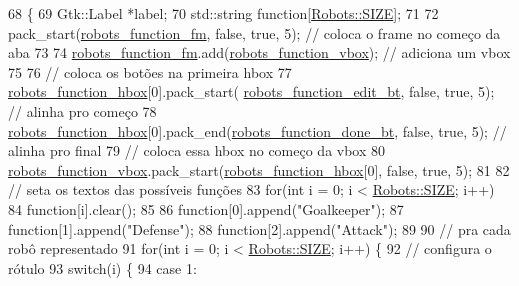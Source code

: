 \begin{DoxyCode}
68                                       \{
69     Gtk::Label *label;
70     std::string \textcolor{keyword}{function}[\hyperlink{class_robots_ae9df2f1d345ad6740f0459956cdd4712}{Robots::SIZE}];
71 
72     pack\_start(\hyperlink{class_robot_g_u_i_af29bd5e935aaf337c5e2afaa4dd2119a}{robots\_function\_fm}, \textcolor{keyword}{false}, \textcolor{keyword}{true}, 5); \textcolor{comment}{// coloca o frame no começo da aba}
73 
74     \hyperlink{class_robot_g_u_i_af29bd5e935aaf337c5e2afaa4dd2119a}{robots\_function\_fm}.add(\hyperlink{class_robot_g_u_i_a6d09ae30b925d6efd7c16e20b21c1781}{robots\_function\_vbox}); \textcolor{comment}{// adiciona um vbox}
75 
76     \textcolor{comment}{// coloca os botões na primeira hbox}
77     \hyperlink{class_robot_g_u_i_aba8f9fd9d3cfea4e5b4fe262ac6e3c0b}{robots\_function\_hbox}[0].pack\_start(
      \hyperlink{class_robot_g_u_i_ac474c7d61bd07aaf26f75acb691e2971}{robots\_function\_edit\_bt}, \textcolor{keyword}{false}, \textcolor{keyword}{true}, 5); \textcolor{comment}{// alinha pro começo}
78     \hyperlink{class_robot_g_u_i_aba8f9fd9d3cfea4e5b4fe262ac6e3c0b}{robots\_function\_hbox}[0].pack\_end(\hyperlink{class_robot_g_u_i_a17db9c0ad94bd601734b87c6aff3fcf0}{robots\_function\_done\_bt}, \textcolor{keyword}{
      false}, \textcolor{keyword}{true}, 5); \textcolor{comment}{// alinha pro final}
79     \textcolor{comment}{// coloca essa hbox no começo da vbox}
80     \hyperlink{class_robot_g_u_i_a6d09ae30b925d6efd7c16e20b21c1781}{robots\_function\_vbox}.pack\_start(\hyperlink{class_robot_g_u_i_aba8f9fd9d3cfea4e5b4fe262ac6e3c0b}{robots\_function\_hbox}[0], \textcolor{keyword}{false},
       \textcolor{keyword}{true}, 5);
81 
82     \textcolor{comment}{// seta os textos das possíveis funções}
83     \textcolor{keywordflow}{for}(\textcolor{keywordtype}{int} i = 0; i < \hyperlink{class_robots_ae9df2f1d345ad6740f0459956cdd4712}{Robots::SIZE}; i++)
84         \textcolor{keyword}{function}[i].clear();
85 
86     \textcolor{keyword}{function}[0].append(\textcolor{stringliteral}{"Goalkeeper"});
87     \textcolor{keyword}{function}[1].append(\textcolor{stringliteral}{"Defense"});
88     \textcolor{keyword}{function}[2].append(\textcolor{stringliteral}{"Attack"});
89 
90     \textcolor{comment}{// pra cada robô representado}
91     \textcolor{keywordflow}{for}(\textcolor{keywordtype}{int} i = 0; i < \hyperlink{class_robots_ae9df2f1d345ad6740f0459956cdd4712}{Robots::SIZE}; i++) \{
92         \textcolor{comment}{// configura o rótulo}
93         \textcolor{keywordflow}{switch}(i) \{
94             \textcolor{keywordflow}{case} 1:

\end{DoxyCode}
